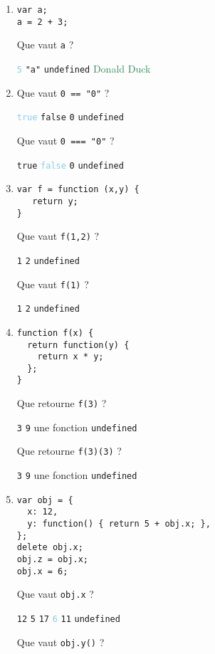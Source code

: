 \documentclass[a4paper, 12pt]{article}
\newcommand{\fullpoint}[1]{\textcolor{RubineRed}{#1}}
\newcommand{\halfpoint}[1]{\textcolor{SkyBlue}{#1}}
\newcommand{\jedipoint}[1]{\textcolor{SeaGreen}{#1}}
\newcommand{\choice}[1]{\Square\hspace{2pt} #1\hspace{5pt}}
\newcommand{\choiceg}[1]{\fullpoint{\XBox\hspace{2pt} #1\hspace{5pt}}}
\newcommand{\choicec}[1]{\Square\hspace{2pt} \lstinline{#1}\hspace{5pt}}
\newcommand{\choicecg}[1]{\fullpoint{\XBox\hspace{2pt} \lstinline{#1}\hspace{5pt}}}
\newcommand{\choicecgh}[1]{\halfpoint{\XBox\hspace{2pt} \lstinline{#1}\hspace{5pt}}}
\begin{document}
\begin{enumerate}
\item \lstset{language=javascript}
\begin{lstlisting}
var a;
a = 2 + 3;
\end{lstlisting}

  Que vaut \lstinline{a} ?

  \choicecgh{5} \choicec{"a"} \choicec{undefined} \jedipoint{\choice{Donald Duck}}
\item \lstset{language=javascript}
  Que vaut \lstinline{0 == "0"} ?

  \choicecgh{true} \choicec{false} \choicec{0} \choicec{undefined}

  Que vaut \lstinline{0 === "0"} ?

  \choicec{true} \choicecgh{false} \choicec{0} \choicec{undefined}
\item \lstset{language=javascript}
\begin{lstlisting}
var f = function (x,y) {
   return y;
}
\end{lstlisting}

   Que vaut \lstinline{f(1,2)} ?

   \choicec{1} \choicecg{2} \choicec{undefined}

   Que vaut \lstinline{f(1)} ?

   \choicec{1} \choicec{2} \choicecg{undefined}
\item \lstset{language=javascript}
\begin{lstlisting}
function f(x) {
  return function(y) {
    return x * y;
  };
}
\end{lstlisting}

  Que retourne \lstinline{f(3)} ?

  \choicec{3} \choicec{9} \choiceg{une fonction} \choicec{undefined}

  Que retourne \lstinline{f(3)(3)} ?

  \choicec{3} \choicecg{9} \choice{une fonction} \choicec{undefined}
\item \lstset{language=javascript}
\begin{lstlisting}
var obj = {
  x: 12,
  y: function() { return 5 + obj.x; },
};
delete obj.x;
obj.z = obj.x;
obj.x = 6;
\end{lstlisting}

  Que vaut \lstinline{obj.x} ?

  \choicec{12} \choicec{5} \choicec{17} \choicecgh{6} \choicec{11} \choicec{undefined}

  Que vaut \lstinline{obj.y()} ?


\end{enumerate}
\end{document}
